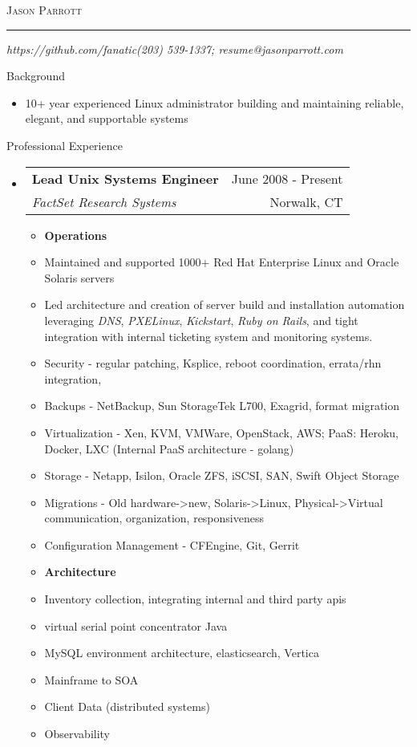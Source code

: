 \documentclass[letterpaper,10pt]{article}
\makeatletter
\newcommand{\name}{Jason Parrott}
\newcommand{\addr}{https://github.com/fanatic}
\newcommand{\phone}{(203) 539-1337}
\newcommand{\email}{resume@jasonparrott.com}
\newcommand{\bigname}[1]{
	\begin{center}\fontfamily{phv}\selectfont\Huge\scshape#1\end{center}
}
\newenvironment{ressection}[1]{
	\vspace{4pt}
	{\fontfamily{phv}\selectfont\Large#1}
	\begin{itemize}
	\vspace{3pt}
}{
	\end{itemize}
}
\newcommand{\resitem}[1]{
	\vspace{-4pt}
	\item \begin{flushleft} #1 \end{flushleft}
}
\newcommand{\ressubitem}[1]{
	\vspace{-1pt}
	\item \begin{flushleft} #1 \end{flushleft}
}
\newcommand{\resbigitem}[4]{
	\vspace{-5pt}
	\item
	\begin{tabular*}{6in}{l@{\extracolsep{\fill}}r}
		\textbf{#1} & #2 \\
		\textit{#3} & #4\\
	\end{tabular*}
}
\newenvironment{ressubsec}[4]{
	\resbigitem{#1}{#2}{#3}{#4}
	\vspace{-2pt}
	\begin{itemize}
}{
	\end{itemize}
}
\makeatother
\begin{document}
\bigname{\name}

\vspace{-8pt} \rule{\textwidth}{1pt}

\vspace{-1pt} {\small\itshape \addr \hfill \phone; \email}

\vspace{8 pt}

\begin{ressection}{Background}
	\item
	10+ year experienced Linux administrator building and maintaining reliable, elegant, and supportable systems
\end{ressection}

\begin{ressection}{Professional Experience}
	\begin{ressubsec}{Lead Unix Systems Engineer}{June 2008 - Present}{FactSet Research Systems}{Norwalk, CT}
		\resitem{\textbf{Operations}}
		\ressubitem{Maintained and supported 1000+ Red Hat Enterprise Linux and Oracle Solaris servers}
		\ressubitem{Led architecture and creation of server build and installation automation leveraging \textit{DNS}, \textit{PXELinux}, \textit{Kickstart}, \textit{Ruby on Rails}, and tight integration with internal ticketing system and monitoring systems.}
		\ressubitem{Security - regular patching, Ksplice, reboot coordination, errata/rhn integration, }
		\ressubitem{Backups - NetBackup, Sun StorageTek L700, Exagrid, format migration}
		\ressubitem{Virtualization - Xen, KVM, VMWare, OpenStack, AWS; PaaS: Heroku, Docker, LXC (Internal PaaS architecture - golang)}
		\ressubitem{Storage - Netapp, Isilon, Oracle ZFS, iSCSI, SAN,  Swift Object Storage}
		\ressubitem{Migrations - Old hardware->new, Solaris->Linux, Physical->Virtual communication, organization, responsiveness}
		\ressubitem{Configuration Management - CFEngine, Git, Gerrit}
		\resitem{\textbf{Architecture}}
		\ressubitem{Inventory collection, integrating internal and third party apis}
		\ressubitem{virtual serial point concentrator Java}
		\ressubitem{MySQL environment architecture, elasticsearch, Vertica}
		\ressubitem{Mainframe to SOA}
		\ressubitem{Client Data (distributed systems)}
		\ressubitem{Observability}
	\end{ressubsec}


\end{ressection}
\end{document}
